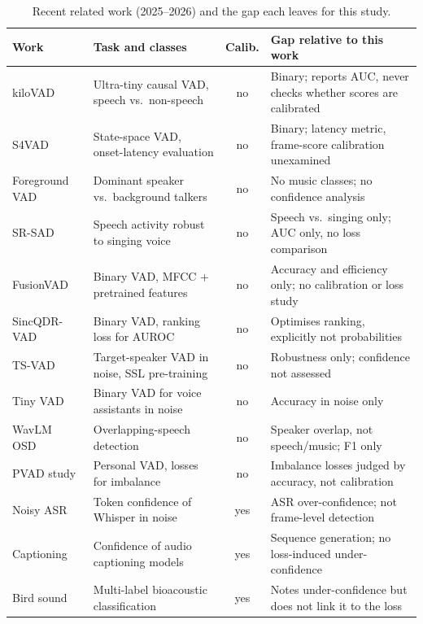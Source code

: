 \documentclass[conference]{IEEEtran}
\begin{document}
\begin{table}[t]
\caption{Recent related work (2025--2026) and the gap each leaves for this study.}
\label{tab:related}
\centering
\footnotesize
\setlength{\tabcolsep}{4pt}
\begin{tabularx}{\textwidth}{@{}p{2.75cm}p{5.6cm}cY@{}}
\toprule
\textbf{Work} & \textbf{Task and classes} & \textbf{Calib.} & \textbf{Gap relative to this work} \\
\midrule
kiloVAD~\cite{bauer2026kilovad} & Ultra-tiny causal VAD, speech vs.\ non-speech & no & Binary; reports AUC, never checks whether scores are calibrated \\
S4VAD~\cite{cohen2026s4vad} & State-space VAD, onset-latency evaluation & no & Binary; latency metric, frame-score calibration unexamined \\
Foreground VAD~\cite{yang2026fvad} & Dominant speaker vs.\ background talkers & no & No music classes; no confidence analysis \\
SR-SAD~\cite{grundhuber2025srsad} & Speech activity robust to singing voice & no & Speech vs.\ singing only; AUC only, no loss comparison \\
FusionVAD~\cite{tripathi2025fusionvad} & Binary VAD, MFCC + pretrained features & no & Accuracy and efficiency only; no calibration or loss study \\
SincQDR-VAD~\cite{wang2025sincqdr} & Binary VAD, ranking loss for AUROC & no & Optimises ranking, explicitly not probabilities \\
TS-VAD~\cite{bovbjerg2025tsvad} & Target-speaker VAD in noise, SSL pre-training & no & Robustness only; confidence not assessed \\
Tiny VAD~\cite{jafarzadeh2025tinyvad} & Binary VAD for voice assistants in noise & no & Accuracy in noise only \\
WavLM OSD~\cite{sun2025osd} & Overlapping-speech detection & no & Speaker overlap, not speech/music; F1 only \\
PVAD study~\cite{yeh2025pvad} & Personal VAD, losses for imbalance & no & Imbalance losses judged by accuracy, not calibration \\
\midrule
Noisy ASR~\cite{huo2025overconfidence} & Token confidence of Whisper in noise & yes & ASR over-confidence; not frame-level detection \\
Captioning~\cite{dunker2025aac} & Confidence of audio captioning models & yes & Sequence generation; no loss-induced under-confidence \\
Bird sound~\cite{schwinger2026bird} & Multi-label bioacoustic classification & yes & Notes under-confidence but does not link it to the loss \\

\end{tabularx}
\end{table}
\end{document}

